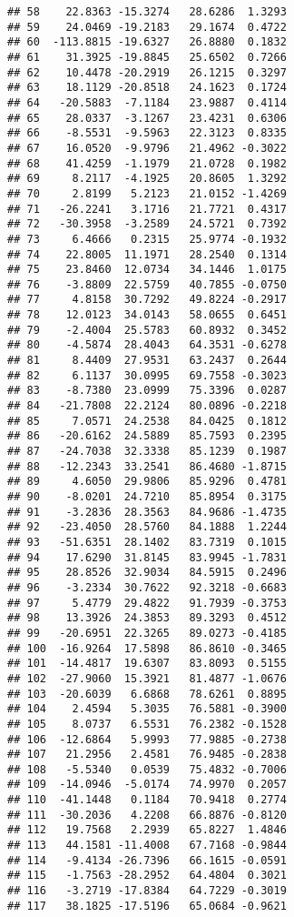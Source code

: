 \documentclass[
]{article}
\begin{document}
\begin{verbatim}
## 58    22.8363 -15.3274   28.6286  1.3293
## 59    24.0469 -19.2183   29.1674  0.4722
## 60  -113.8815 -19.6327   26.8880  0.1832
## 61    31.3925 -19.8845   25.6502  0.7266
## 62    10.4478 -20.2919   26.1215  0.3297
## 63    18.1129 -20.8518   24.1623  0.1724
## 64   -20.5883  -7.1184   23.9887  0.4114
## 65    28.0337  -3.1267   23.4231  0.6306
## 66    -8.5531  -9.5963   22.3123  0.8335
## 67    16.0520  -9.9796   21.4962 -0.3022
## 68    41.4259  -1.1979   21.0728  0.1982
## 69     8.2117  -4.1925   20.8605  1.3292
## 70     2.8199   5.2123   21.0152 -1.4269
## 71   -26.2241   3.1716   21.7721  0.4317
## 72   -30.3958  -3.2589   24.5721  0.7392
## 73     6.4666   0.2315   25.9774 -0.1932
## 74    22.8005  11.1971   28.2540  0.1314
## 75    23.8460  12.0734   34.1446  1.0175
## 76    -3.8809  22.5759   40.7855 -0.0750
## 77     4.8158  30.7292   49.8224 -0.2917
## 78    12.0123  34.0143   58.0655  0.6451
## 79    -2.4004  25.5783   60.8932  0.3452
## 80    -4.5874  28.4043   64.3531 -0.6278
## 81     8.4409  27.9531   63.2437  0.2644
## 82     6.1137  30.0995   69.7558 -0.3023
## 83    -8.7380  23.0999   75.3396  0.0287
## 84   -21.7808  22.2124   80.0896 -0.2218
## 85     7.0571  24.2538   84.0425  0.1812
## 86   -20.6162  24.5889   85.7593  0.2395
## 87   -24.7038  32.3338   85.1239  0.1987
## 88   -12.2343  33.2541   86.4680 -1.8715
## 89     4.6050  29.9806   85.9296  0.4781
## 90    -8.0201  24.7210   85.8954  0.3175
## 91    -3.2836  28.3563   84.9686 -1.4735
## 92   -23.4050  28.5760   84.1888  1.2244
## 93   -51.6351  28.1402   83.7319  0.1015
## 94    17.6290  31.8145   83.9945 -1.7831
## 95    28.8526  32.9034   84.5915  0.2496
## 96    -3.2334  30.7622   92.3218 -0.6683
## 97     5.4779  29.4822   91.7939 -0.3753
## 98    13.3926  24.3853   89.3293  0.4512
## 99   -20.6951  22.3265   89.0273 -0.4185
## 100  -16.9264  17.5898   86.8610 -0.3465
## 101  -14.4817  19.6307   83.8093  0.5155
## 102  -27.9060  15.3921   81.4877 -1.0676
## 103  -20.6039   6.6868   78.6261  0.8895
## 104    2.4594   5.3035   76.5881 -0.3900
## 105    8.0737   6.5531   76.2382 -0.1528
## 106  -12.6864   5.9993   77.9885 -0.2738
## 107   21.2956   2.4581   76.9485 -0.2838
## 108   -5.5340   0.0539   75.4832 -0.7006
## 109  -14.0946  -5.0174   74.9970  0.2057
## 110  -41.1448   0.1184   70.9418  0.2774
## 111  -30.2036   4.2208   66.8876 -0.8120
## 112   19.7568   2.2939   65.8227  1.4846
## 113   44.1581 -11.4008   67.7168 -0.9844
## 114   -9.4134 -26.7396   66.1615 -0.0591
## 115   -1.7563 -28.2952   64.4804  0.3021
## 116   -3.2719 -17.8384   64.7229 -0.3019
## 117   38.1825 -17.5196   65.0684 -0.9621

\end{verbatim}
\end{document}
